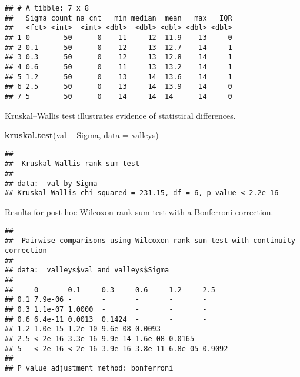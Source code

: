 \documentclass[]{book}
\newenvironment{Shaded}{\begin{snugshade}}{\end{snugshade}}
\newcommand{\DataTypeTok}[1]{\textcolor[rgb]{0.13,0.29,0.53}{#1}}
\newcommand{\KeywordTok}[1]{\textcolor[rgb]{0.13,0.29,0.53}{\textbf{#1}}}
\newcommand{\NormalTok}[1]{#1}
\newcommand{\OperatorTok}[1]{\textcolor[rgb]{0.81,0.36,0.00}{\textbf{#1}}}
\newcommand{\OtherTok}[1]{\textcolor[rgb]{0.56,0.35,0.01}{#1}}
\newcommand{\StringTok}[1]{\textcolor[rgb]{0.31,0.60,0.02}{#1}}
\begin{document}
\begin{verbatim}
## # A tibble: 7 x 8
##   Sigma count na_cnt   min median  mean   max   IQR
##   <fct> <int>  <int> <dbl>  <dbl> <dbl> <dbl> <dbl>
## 1 0        50      0    11     12  11.9    13     0
## 2 0.1      50      0    12     13  12.7    14     1
## 3 0.3      50      0    12     13  12.8    14     1
## 4 0.6      50      0    11     13  13.2    14     1
## 5 1.2      50      0    13     14  13.6    14     1
## 6 2.5      50      0    13     14  13.9    14     0
## 7 5        50      0    14     14  14      14     0
\end{verbatim}

Kruskal--Wallis test illustrates evidence of statistical differences.

\begin{Shaded}
\begin{Highlighting}[]
\KeywordTok{kruskal.test}\NormalTok{(val }\OperatorTok{~}\StringTok{ }\NormalTok{Sigma, }\DataTypeTok{data =}\NormalTok{ valleys)}
\end{Highlighting}
\end{Shaded}

\begin{verbatim}
## 
##  Kruskal-Wallis rank sum test
## 
## data:  val by Sigma
## Kruskal-Wallis chi-squared = 231.15, df = 6, p-value < 2.2e-16
\end{verbatim}

Results for post-hoc Wilcoxon rank-sum test with a Bonferroni correction.

\begin{Shaded}
\end{Shaded}

\begin{verbatim}
## 
##  Pairwise comparisons using Wilcoxon rank sum test with continuity correction 
## 
## data:  valleys$val and valleys$Sigma 
## 
##     0       0.1     0.3     0.6     1.2     2.5   
## 0.1 7.9e-06 -       -       -       -       -     
## 0.3 1.1e-07 1.0000  -       -       -       -     
## 0.6 6.4e-11 0.0013  0.1424  -       -       -     
## 1.2 1.0e-15 1.2e-10 9.6e-08 0.0093  -       -     
## 2.5 < 2e-16 3.3e-16 9.9e-14 1.6e-08 0.0165  -     
## 5   < 2e-16 < 2e-16 3.9e-16 3.8e-11 6.8e-05 0.9092
## 
## P value adjustment method: bonferroni
\end{verbatim}
\end{document}
